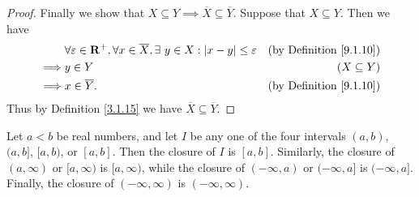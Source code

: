 \begin{proof}
    Finally we show that \(X \subseteq Y \implies \overline{X} \subseteq \overline{Y}\).
    Suppose that \(X \subseteq Y\).
    Then we have
    \begin{align*}
                 & \forall \varepsilon \in \mathbf{R}^+, \forall x \in \overline{X}, \exists\ y \in X : \left\lvert x - y\right\rvert \leq \varepsilon & \text{(by Definition \ref{9.1.10})} \\
        \implies & y \in Y                                                                                                   & (X \subseteq Y)                     \\
        \implies & x \in \overline{Y}.                                                                                       & \text{(by Definition \ref{9.1.10})}
    \end{align*}
    Thus by Definition \ref{3.1.15} we have \(\overline{X} \subseteq \overline{Y}\).
\end{proof}

\begin{lemma}\label{9.1.12}
    Let \(a < b\) be real numbers, and let \(I\) be any one of the four intervals \((a, b)\), \((a, b]\), \([a, b)\), or \([a, b]\).
    Then the closure of \(I\) is \([a, b]\).
    Similarly, the closure of \((a, \infty)\) or \([a, \infty)\) is \([a, \infty)\), while the closure of \((-\infty, a)\) or \((-\infty, a]\) is \((-\infty, a]\).
    Finally, the closure of \((-\infty, \infty)\) is \((-\infty, \infty)\).
\end{lemma}

